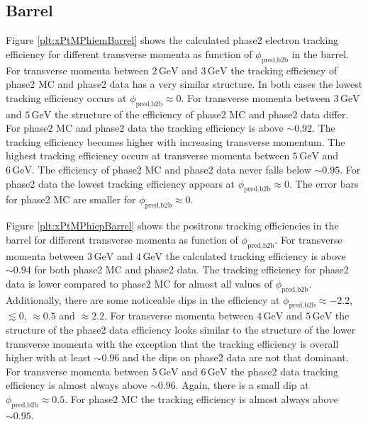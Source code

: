 \documentclass[a4paper,11pt,twosided,final,german,openbib,pdftex,listof=totoc,bibliography=totoc]{scrbook}
\begin{document}
\newpage

\subsection{Barrel}

Figure \ref{plt:xPtMPhiemBarrel} shows the calculated phase2 electron tracking efficiency for different transverse momenta as function of $\phi_{\textrm{pred,b2b}}$ in the barrel. For transverse momenta between $2\,\textrm{GeV}$ and $3\,\textrm{GeV}$ the tracking efficiency of phase2 MC and phase2 data has a very similar structure. In both cases the lowest tracking efficiency occurs at $\phi_{\textrm{pred,b2b}} \approx 0$. 
For transverse momenta between $3\,\textrm{GeV}$ and $5\,\textrm{GeV}$ the structure of the efficiency of phase2 MC and phase2 data differ. For phase2 MC and phase2 data the tracking efficiency is above $\sim 0.92$. The tracking efficiency becomes higher with increasing transverse momentum. The highest tracking efficiency occurs at transverse momenta between $5\,\textrm{GeV}$ and $6\,\textrm{GeV}$. The efficiency of phase2 MC and phase2 data never falls below $\sim 0.95$. 
For phase2 data the lowest tracking efficiency appears at $\phi_{\textrm{pred,b2b}} \approx 0$. The error bars for phase2 MC are smaller for $\phi_{\textrm{pred,b2b}} \approx 0$.


Figure \ref{plt:xPtMPhiepBarrel} shows the positrons tracking efficiencies in the barrel for different transverse momenta as function of $\phi_{\textrm{pred,b2b}}$. 
For transverse momenta between $3\,\textrm{GeV}$ and $4\,\textrm{GeV}$ the calculated tracking efficiency is above $\sim 0.94$ for both phase2 MC and phase2 data. The tracking efficiency for phase2 data is lower compared to phase2 MC for almost all values of $\phi_{\textrm{pred,b2b}}$. Additionally, there are some noticeable dips in the efficiency at $\phi_{\textrm{pred,b2b}} \approx -2.2$, $ \lesssim 0$, $ \approx 0.5$ and $ \approx 2.2$. 
For transverse momenta between $4\,\textrm{GeV}$ and $5\,\textrm{GeV}$ the structure of the phase2 data efficiency looks similar to the structure of the lower transverse momenta with the exception that the tracking efficiency is overall higher with at least $\sim 0.96$ and the dips on phase2 data are not that dominant. 
For transverse momenta between $5\,\textrm{GeV}$ and $6\,\textrm{GeV}$ the phase2 data tracking efficiency is almost always above $\sim 0.96$. Again, there is a small dip at $\phi_{\textrm{pred,b2b}} \approx 0.5$. For phase2 MC the tracking efficiency is almost always above $\sim 0.95$. 
\end{document}
